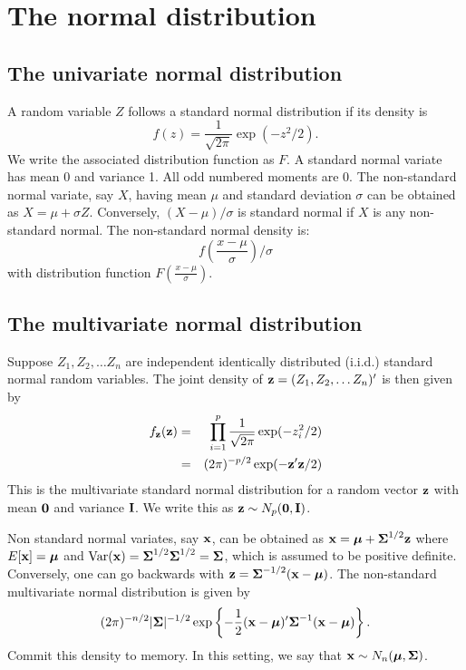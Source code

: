 \section{The normal distribution}



\subsection{The univariate normal distribution}
A random variable $Z$ follows a standard normal distribution if its
density is 
$$
f(z) = \frac{1}{\sqrt{2\pi}} \exp(-z^2/2).
$$
We write the associated distribution function as $F$. 
A standard normal variate has mean 0 and variance 1. 
All odd numbered moments are 0. The non-standard
normal variate, say $X$, having mean $\mu$ 
and standard deviation $\sigma$ can be obtained
as $X = \mu + \sigma Z$. Conversely, 
$(X - \mu) / \sigma$ is standard normal if
$X$ is any non-standard normal. The
non-standard normal density is:
$$
f \left( \frac{x - \mu}{\sigma}\right) /\sigma
$$
with distribution function $F \left( \frac{x - \mu}{\sigma}\right)$.

\subsection{The multivariate normal distribution}

Suppose $Z_1, Z_2, \ldots Z_n$ are independent identically distributed (i.i.d.) standard normal random variables. The joint density of $\mathbf{z} = (Z_1, Z_2, \ldots Z_n)'$
is then given by
\begin{eqnarray*}
f_{\mathbf{z}}(\mathbf{z}) &=& \prod_{i=1}^p  \frac{1}{\sqrt{2\pi}} \exp(-z_i^2/2) \\
&=&  (2\pi)^{-p/2} \exp(-\mathbf{z}'\mathbf{z}/2) 
\end{eqnarray*}
This is the multivariate standard normal distribution for a 
random vector $\mathbf{z}$ with  mean $\mathbf{0}$ and variance $\mathbf{I}$.  We write this as $\mathbf{z} \sim N_p ({\mathbf{0}}, \mathbf{I})$.

Non standard normal variates, say $\mathbf{x}$, can be obtained as 
$\mathbf{x} = \boldsymbol{\mu} + \boldsymbol{\Sigma}^{1/2} \mathbf{z}$ where $E[\mathbf{x}] = \boldsymbol{\mu}$
and $\mbox{Var}(\mathbf{x}) = \boldsymbol{\Sigma}^{1/2}\boldsymbol{\Sigma}^{1/2} = \boldsymbol{\Sigma}$, which is assumed
to be positive definite. 
Conversely, one can go backwards with 
$\mathbf{z} = \boldsymbol{\Sigma}^{-1/2} (\mathbf{x} - \boldsymbol{\mu})$. The non-standard
multivariate normal distribution is given by
$$
(2\pi)^{-n/2} |\boldsymbol{\Sigma}|^{-1/2} \exp\left\{ -\frac{1}{2}(\mathbf{x} - \boldsymbol{\mu})' \boldsymbol{\Sigma}^{-1} (\mathbf{x} - \boldsymbol{\mu}) \right\}.
$$
Commit this density to memory.  In this setting, we say that $\mathbf{x} \sim N_n (\boldsymbol{\mu}, \boldsymbol{\Sigma})$.

